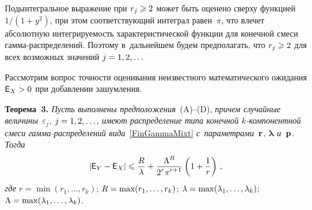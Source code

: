 \begin{multicols}{2}
Подынтегральное выражение при $r_j\hm\geqslant 2$ может быть оценено сверху 
функцией $1/({1+y^2})$, при этом соответствующий интеграл равен~$\pi$, что влечет 
абсолютную интегрируемость характеристической функции для конечной смеси 
гам\-ма-рас\-пре\-де\-ле\-ний. Поэтому в~дальнейшем будем предполагать,
 что $r_j\hm\geqslant 2$ для всех возможных значений $j\hm=1,2,\ldots$

Рассмотрим вопрос точ\-ности оценивания неизвестного математического ожидания ${\sf E}_X\hm>0$ 
при добавлении зашумления.

\smallskip

\noindent
\textbf{Теорема~3.}
\textit{Пусть выполнены предположения}~(A)--(D), 
\textit{причем случайные величины~$\varepsilon_j$, $j\hm=1,2,\ldots$, имеют 
распределение типа конечной $k$-ком\-по\-нент\-ной смеси 
гам\-ма-рас\-пре\-де\-ле\-ний вида}~\eqref{FinGammaMixt} 
\textit{с~па\-ра\-мет\-ра\-ми~${\bf r}$, $\boldsymbol{\lambda}$ и~${\bf p}$. Тогда}
\begin{equation}
\label{Th3Eq}
\left\lvert {\sf E}_Y-{\sf E}_X\right\rvert \leqslant \displaystyle\frac{\displaystyle R\mathstrut}{\displaystyle \lambda\mathstrut}+
\displaystyle\frac{\displaystyle \Lambda^{R}\mathstrut}{\displaystyle 2^{r}\pi^{r+1}\mathstrut}\left(1+\frac1{r}\right)\,,
\end{equation}
\textit{где} $r=\min(r_1, \ldots,r_k)$; $R\hm=\max(r_1, \ldots,r_k)$; 
$\lambda\hm=\max(\lambda_1, \ldots,\lambda_k)$; 
$\Lambda\hm=\max(\lambda_1, \ldots,\lambda_k)$.

\smallskip


\end{multicols}
